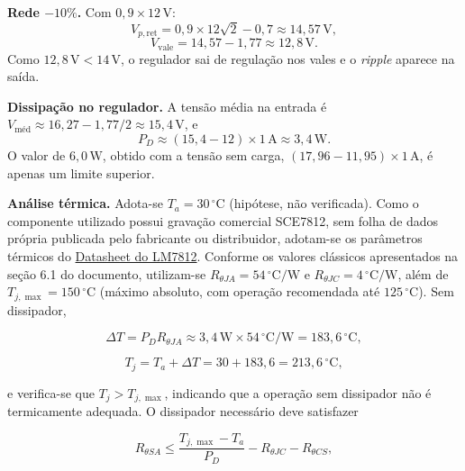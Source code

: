 \textbf{Rede $-10\%$.} Com $0{,}9 \times 12\,\text{V}$:
\begin{equation}
V_{p,\text{ret}} = 0{,}9 \times 12\sqrt{2} - 0{,}7 \approx 14{,}57\,\text{V},
\label{eq:teoria_rede}
\end{equation}
\begin{equation}
V_{\text{vale}} = 14{,}57 - 1{,}77 \approx 12{,}8\,\text{V}.
\end{equation}
Como $12{,}8\,\text{V} < 14\,\text{V}$, o regulador sai de regulação nos vales e o \textit{ripple} aparece na saída.

\textbf{Dissipação no regulador.} A tensão média na entrada é $V_{\text{méd}} \approx 16{,}27 - 1{,}77/2 \approx 15{,}4\,\text{V}$, e
\begin{equation}
P_D \approx (15{,}4 - 12) \times 1\,\text{A} \approx 3{,}4\,\text{W}.
\label{eq:teoria_pd}
\end{equation}
O valor de $6{,}0\,\text{W}$, obtido com a tensão sem carga, $(17{,}96 - 11{,}95) \times 1\,\text{A}$, é apenas um limite superior.

\textbf{Análise térmica.} Adota-se $T_a = 30\,^\circ\mathrm{C}$ (hipótese, não verificada). Como o componente utilizado possui gravação comercial SCE7812, sem folha de dados própria publicada pelo fabricante ou distribuidor, adotam-se os parâmetros térmicos do \href{https://www.ti.com/lit/ds/symlink/lm340.pdf}{Datasheet do LM7812}. Conforme os valores clássicos apresentados na seção 6.1 do documento, utilizam-se $R_{\theta JA} = 54\,^\circ\mathrm{C/W}$ e $R_{\theta JC} = 4\,^\circ\mathrm{C/W}$, além de $T_{j,\max} = 150\,^\circ\mathrm{C}$ (máximo absoluto, com operação recomendada até $125\,^\circ\mathrm{C}$). Sem dissipador,

\begin{equation}
\Delta T = P_D R_{\theta JA} \approx 3{,}4\,\mathrm{W} \times 54\,^\circ\mathrm{C/W} = 183{,}6\,^\circ\mathrm{C},
\tag{19}
\end{equation}

\begin{equation}
T_j = T_a + \Delta T = 30 + 183{,}6 = 213{,}6\,^\circ\mathrm{C},
\tag{20}
\end{equation}

e verifica-se que $T_j > T_{j,\max}$, indicando que a operação sem dissipador não é termicamente adequada. O dissipador necessário deve satisfazer

\begin{equation}
R_{\theta SA} \leq \frac{T_{j,\max} - T_a}{P_D} - R_{\theta JC} - R_{\theta CS},
\tag{21}
\end{equation}

